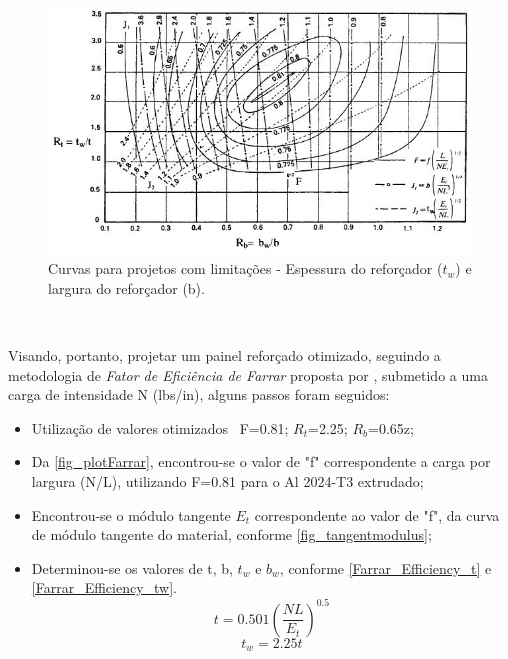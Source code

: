 {\begin{figure}[ht]
	\caption{\label{fig_plotstiffener}Curvas para projetos com limitações - Espessura do reforçador ($t_w$) e largura do reforçador (b).}
  \centering
  \includegraphics[scale=1.0]{figura/PlotStiffener}
\end{figure}
\

Visando, portanto, projetar um painel reforçado otimizado, seguindo a metodologia de \emph{Fator de Eficiência de Farrar} proposta por \cite{niu1997airframe}, submetido a uma carga de intensidade N (lbs/in), alguns passos foram seguidos:

\begin{itemize}
\item Utilização de valores otimizados \
F=0.81; $R_t$=2.25; $R_b$=0.65z;\
\item Da \autoref{fig_plotFarrar}, encontrou-se o valor de "f" correspondente a carga por largura (N/L), utilizando F=0.81 para o Al 2024-T3 extrudado;
\item Encontrou-se o módulo tangente $E_t$ correspondente ao valor de "f", da curva de módulo tangente do material, conforme \autoref{fig_tangentmodulus};
\item Determinou-se os valores de t, b, $t_w$ e $b_w$, conforme \autoref{Farrar_Efficiency_t} e \autoref{Farrar_Efficiency_tw}.
\begin{equation} \label{Farrar_Efficiency_t}
t = 0.501({\dfrac{NL}{E_t}})^{0.5}
\end{equation}
\begin{equation} \label{Farrar_Efficiency_tw}
t_w = 2.25t
\end{equation}

\end{itemize}

}
